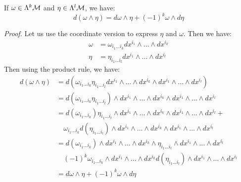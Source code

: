 \begin{lemma}
    If $\omega \in \Lambda^k\mathcal M$ and $\eta\in \Lambda^l\mathcal M$, we have:
    $$d(\omega \wedge \eta) = d\omega\wedge\eta + (-1)^k\omega\wedge d\eta$$
\end{lemma}
\textit{Proof.} Let us use the coordinate version to express $\eta$ and $\omega$. Then we have:
\begin{align*}
    \omega &= \omega_{i_1\ldots i_k} dx^{i_1}\wedge\ldots\wedge dx^{i_k}\\
     \eta &= \eta_{i_1\ldots i_l} dx^{i_1}\wedge\ldots\wedge dx^{i_l}
\end{align*}
Then using the product rule, we have:
\begin{align*}
    d(\omega\wedge \eta) &= d(\omega_{i_1\ldots i_k}\eta_{i_1\ldots i_l} dx^{i_1}\wedge\ldots\wedge dx^{i_k}\wedge dx^{i_1}\wedge\ldots\wedge dx^{i_l})\\
    &=d(\omega_{i_1\ldots i_k}\eta_{i_1\ldots i_l})\wedge dx^{i_1}\wedge\ldots\wedge dx^{i_k}\wedge dx^{i_1}\wedge\ldots\wedge dx^{i_l}\\
    &=d(\omega_{i_1\ldots i_k})\eta_{i_1\ldots i_l}\wedge dx^{i_1}\wedge\ldots\wedge dx^{i_k}\wedge dx^{i_1}\wedge\ldots\wedge dx^{i_l}+\\
    &\quad \omega_{i_1\ldots i_k}d(\eta_{i_1\ldots i_l})\wedge dx^{i_1}\wedge\ldots\wedge dx^{i_k}\wedge dx^{i_1}\wedge\ldots\wedge dx^{i_l}\\
    &=d(\omega_{i_1\ldots i_k})\wedge dx^{i_1}\wedge\ldots\wedge dx^{i_k}\wedge \eta_{i_1\ldots i_l}\wedge dx^{i_1}\wedge\ldots\wedge dx^{i_l}\\
    &\quad (-1)^k \omega_{i_1\ldots i_k}\wedge dx^{i_1}\wedge\ldots\wedge dx^{i_k} d(\eta_{i_1\ldots i_l})\wedge dx^{i_1}\wedge\ldots\wedge dx^{i_l}\\
    &=d\omega\wedge \eta + (-1)^k \omega\wedge d\eta
\end{align*}
